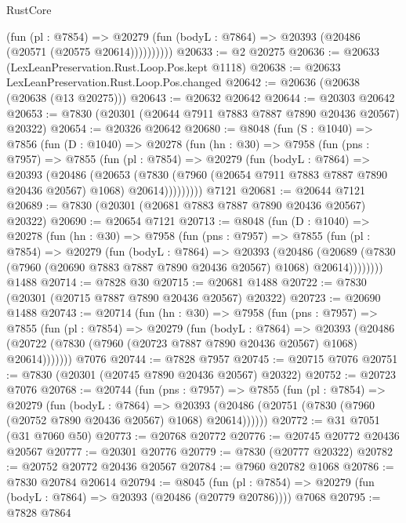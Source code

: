 \begin{lexlean}{RustCore}
\begin{coremodule}
              (fun (pl : @7854) =>
              @20279 (fun (bodyL : @7864) => @20393 (@20486 (@20571 (@20575 @20614))))))))))
@20633 := @2 @20275
@20636 := @20633 (LexLeanPreservation.Rust.Loop.Pos.kept @1118)
@20638 := @20633 LexLeanPreservation.Rust.Loop.Pos.changed
@20642 := @20636 (@20638 (@20638 (@13 @20275)))
@20643 := @20632 @20642
@20644 := @20303 @20642
@20653 := @7830 (@20301 (@20644 @7911 @7883 @7887 @7890 @20436 @20567) @20322)
@20654 := @20326 @20642
@20680 := @8048
    (fun (S : @1040) =>
    @7856
      (fun (D : @1040) =>
      @20278
        (fun (hn : @30) =>
        @7958
          (fun (pns : @7957) =>
          @7855
            (fun (pl : @7854) =>
            @20279
              (fun (bodyL : @7864) =>
              @20393
                (@20486
                  (@20653
                    (@7830
                      (@7960 (@20654 @7911 @7883 @7887 @7890 @20436 @20567) @1068)
                      @20614)))))))))
    @7121
@20681 := @20644 @7121
@20689 := @7830 (@20301 (@20681 @7883 @7887 @7890 @20436 @20567) @20322)
@20690 := @20654 @7121
@20713 := @8048
    (fun (D : @1040) =>
    @20278
      (fun (hn : @30) =>
      @7958
        (fun (pns : @7957) =>
        @7855
          (fun (pl : @7854) =>
          @20279
            (fun (bodyL : @7864) =>
            @20393
              (@20486
                (@20689 (@7830 (@7960 (@20690 @7883 @7887 @7890 @20436 @20567) @1068) @20614))))))))
    @1488
@20714 := @7828 @30
@20715 := @20681 @1488
@20722 := @7830 (@20301 (@20715 @7887 @7890 @20436 @20567) @20322)
@20723 := @20690 @1488
@20743 := @20714
    (fun (hn : @30) =>
    @7958
      (fun (pns : @7957) =>
      @7855
        (fun (pl : @7854) =>
        @20279
          (fun (bodyL : @7864) =>
          @20393
            (@20486 (@20722 (@7830 (@7960 (@20723 @7887 @7890 @20436 @20567) @1068) @20614)))))))
    @7076
@20744 := @7828 @7957
@20745 := @20715 @7076
@20751 := @7830 (@20301 (@20745 @7890 @20436 @20567) @20322)
@20752 := @20723 @7076
@20768 := @20744
    (fun (pns : @7957) =>
    @7855
      (fun (pl : @7854) =>
      @20279
        (fun (bodyL : @7864) =>
        @20393 (@20486 (@20751 (@7830 (@7960 (@20752 @7890 @20436 @20567) @1068) @20614))))))
@20772 := @31 @7051 (@31 @7060 @50)
@20773 := @20768 @20772
@20776 := @20745 @20772 @20436 @20567
@20777 := @20301 @20776
@20779 := @7830 (@20777 @20322)
@20782 := @20752 @20772 @20436 @20567
@20784 := @7960 @20782 @1068
@20786 := @7830 @20784 @20614
@20794 := @8045
    (fun (pl : @7854) => @20279 (fun (bodyL : @7864) => @20393 (@20486 (@20779 @20786))))
    @7068
@20795 := @7828 @7864

\end{coremodule}
\end{lexlean}

